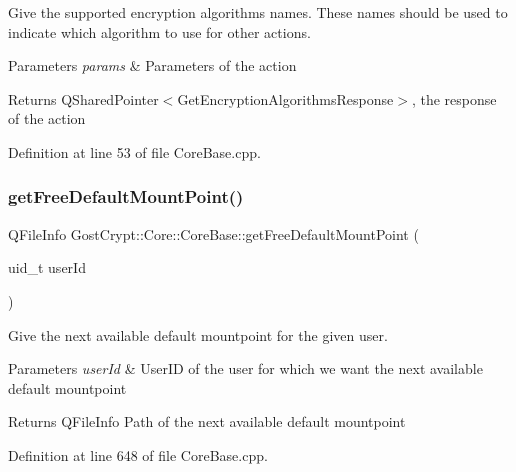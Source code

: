 Give the supported encryption algorithms names. These names should be used to indicate which algorithm to use for other actions. 


\begin{DoxyParams}{Parameters}
{\em params} & Parameters of the action \\
\hline
\end{DoxyParams}
\begin{DoxyReturn}{Returns}
Q\+Shared\+Pointer$<$\+Get\+Encryption\+Algorithms\+Response$>$, the response of the action 
\end{DoxyReturn}


Definition at line 53 of file Core\+Base.\+cpp.

\mbox{\label{class_gost_crypt_1_1_core_1_1_core_base_ad45372f3d1ee5084aa25cec4b1753f28}} 
\subsubsection{\texorpdfstring{get\+Free\+Default\+Mount\+Point()}{getFreeDefaultMountPoint()}}
{\footnotesize\ttfamily Q\+File\+Info Gost\+Crypt\+::\+Core\+::\+Core\+Base\+::get\+Free\+Default\+Mount\+Point (\begin{DoxyParamCaption}\item[{uid\+\_\+t}]{user\+Id }\end{DoxyParamCaption})\hspace{0.3cm}{\ttfamily [protected]}}



Give the next available default mountpoint for the given user. 


\begin{DoxyParams}{Parameters}
{\em user\+Id} & User\+ID of the user for which we want the next available default mountpoint \\
\hline
\end{DoxyParams}
\begin{DoxyReturn}{Returns}
Q\+File\+Info Path of the next available default mountpoint 
\end{DoxyReturn}


Definition at line 648 of file Core\+Base.\+cpp.

